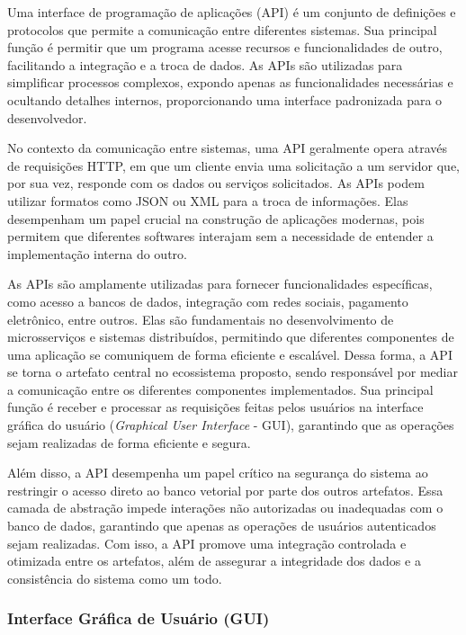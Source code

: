 \documentclass[a4paper, 12pt]{article}
\begin{document}
    Uma interface de programação de aplicações (API) é um conjunto de definições e protocolos que permite a comunicação entre diferentes sistemas. Sua principal função é permitir que um programa acesse recursos e funcionalidades de outro, facilitando a integração e a troca de dados. As APIs são utilizadas para simplificar processos complexos, expondo apenas as funcionalidades necessárias e ocultando detalhes internos, proporcionando uma interface padronizada para o desenvolvedor.

    No contexto da comunicação entre sistemas, uma API geralmente opera através de requisições HTTP, em que um cliente envia uma solicitação a um servidor que, por sua vez, responde com os dados ou serviços solicitados. As APIs podem utilizar formatos como JSON ou XML para a troca de informações. Elas desempenham um papel crucial na construção de aplicações modernas, pois permitem que diferentes softwares interajam sem a necessidade de entender a implementação interna do outro.

    As APIs são amplamente utilizadas para fornecer funcionalidades específicas, como acesso a bancos de dados, integração com redes sociais, pagamento eletrônico, entre outros. Elas são fundamentais no desenvolvimento de microsserviços e sistemas distribuídos, permitindo que diferentes componentes de uma aplicação se comuniquem de forma eficiente e escalável. Dessa forma, a API se torna o artefato central no ecossistema proposto, sendo responsável por mediar a comunicação entre os diferentes componentes implementados. Sua principal função é receber e processar as requisições feitas pelos usuários na interface gráfica do usuário (\textit{Graphical User Interface} - GUI), garantindo que as operações sejam realizadas de forma eficiente e segura.
    
    Além disso, a API desempenha um papel crítico na segurança do sistema ao restringir o acesso direto ao banco vetorial por parte dos outros artefatos. Essa camada de abstração impede interações não autorizadas ou inadequadas com o banco de dados, garantindo que apenas as operações de usuários autenticados sejam realizadas. Com isso, a API promove uma integração controlada e otimizada entre os artefatos, além de assegurar a integridade dos dados e a consistência do sistema como um todo.
    
    \subsubsection{Interface Gráfica de Usuário (GUI)} \label{sec:gui}
    
\end{document}
